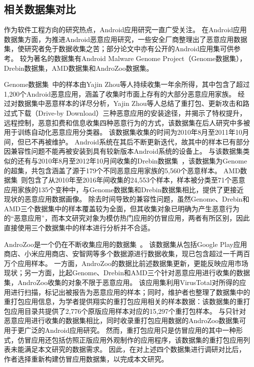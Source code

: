 \subsection{相关数据集对比}

作为软件工程方向的研究热点，Android应用研究一直广受关注。
在Android应用数据集方面，为推进Android恶意应用研究，一些安全厂商整理出了恶意应用数据集，使研究者免于数据收集之苦；部分论文中亦有公开的Android应用集可供参考。
较为著名的数据集有Android Malware Genome Project（Genome数据集），Drebin数据集，AMD数据集和AndroZoo数据集。

Genome数据集~\cite{Zhou2012DissectingAM}中的样本由Yajin Zhou等人持续收集一年余所得，其中包含了超过1,200个Android恶意应用，涵盖了收集时市面上存有的大部分恶意应用家族。
经过对数据集中恶意样本的详尽分析，Yajin Zhou等人总结了重打包、更新攻击和路过式下载（Drive-by Download）三种恶意应用的安装途径，并揭示了特权提升，远程控制，恶意扣费和信息收集四种恶意行为的方式，该数据集在后人研究中多被用于训练自动化恶意应用分类器。
该数据集收集的时间为2010年8月至2011年10月间，但已不再被维护。
Android系统在其后不断更新迭代，故其中的样本已有部分因兼容性问题不能再被安装到具有较新版本Android系统的设备上。
与该数据集类似的还有与2010年8月至2012年10月间收集的Drebin数据集~\cite{arp2014drebin}，该数据集为Genome的超集，共包含涵盖了源于179个不同恶意应用家族的5,560个恶意样本。
AMD数据集~\cite{li2017android}则包含了从2010年至2016年间收集的24,553个样本，样本被分类至71个恶意应用家族的135个变种中，与Genome数据集和Drebin数据集相比，提供了更接近现状的恶意应用数据画像。
除去时间导致的兼容性问题，虽然Genome、Drebin和AMD三个数据集中的样本覆盖较为全面，但其收集对象已明确为产生恶意行为的``恶意应用''，而本文研究对象为模仿热门应用的仿冒应用，两者有所区别，因此直接使用三个数据集中的样本进行分析并不合适。

AndroZoo是一个仍在不断收集应用的数据集~\cite{li2017androzoo++}。
该数据集从包括Google Play应用商店、小米应用商店、安智网等多个数据源进行数据收集，现已包含超过一千两百万个应用样本。
一方面，AndroZoo的数据比前述数据集更新，更能反映应用市场现状；另一方面，比起Genome、Drebin和AMD三个针对恶意应用进行收集的数据集，AndroZoo收集的对象不限于恶意应用。
该应用集利用VirusTotal对所得的应用进行扫描，标记出被报告为恶意应用的样本；同时，维护者也整理了数据集中的重打包应用信息，为学者提供翔实的重打包应用相关的样本数据：该数据集的重打包应用目录共提供了2,776个原版应用样本对应的15,297个重打包样本。
与只针对恶意应用进行收集的数据集相比，同时收录重打包应用数据的AndroZoo数据集可用于更广泛的Android应用研究。
然而，重打包应用只是仿冒应用的其中一种形式，仿冒应用还包括仿照正版应用外观制作的应用程序，该数据集的重打包应用列表未能满足本文研究的数据需求。
因此，在对上述四个数据集进行调研对比后，作者选择重新构建仿冒应用数据集，以完成本文研究。

